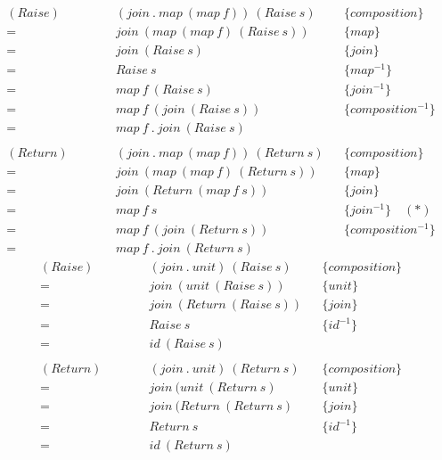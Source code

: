\begin{framed}
  \begin{align*}
      (Raise)\qquad
      &\quad (join\ .\ map\ (map\ f))\ (Raise\ s) && \{composition\}\\
      =&\quad join\ (map\ (map\ f)\ (Raise\ s)) && \{map\}\\
      =&\quad join\ (Raise\ s)  && \{join\}\\
      =&\quad Raise\ s\ && \{map^{-1}\}\\
      =&\quad map\ f\ (Raise\ s) && \{join^{-1}\}\\
      =&\quad map\ f\ (join\ (Raise\ s)) && \{composition^{-1}\}\\
      =&\quad map\ f\ .\ join\ (Raise\ s)\\\\
      (Return)\qquad
      &\quad (join\ .\ map\ (map\ f))\ (Return\ s) && \{composition\}\\
      =&\quad join\ (map\ (map\ f)\ (Return\ s)) && \{map\}\\
      =&\quad join\ (Return\ (map\ f\ s))  && \{join\}\\
      =&\quad map\ f\ s && \{join^{-1}\} \quad(*)\\
      =&\quad map\ f\ (join\ (Return\ s)) && \{composition^{-1}\}\\
      =&\quad map\ f\ .\ join\ (Return\ s)\
  \end{align*}
  \begin{align*}
      (Raise)\qquad
      &\quad (join\ .\ unit)\ (Raise\ s) && \{composition\}\\
      =&\quad join\ (unit\ (Raise\ s)) && \{unit\}\\
      =&\quad join\ (Return\ (Raise\ s)) && \{join\}\\
      =&\quad Raise\ s && \{id^{-1}\}\\
      =&\quad id\ (Raise\ s) \\\\
      (Return)\qquad
      &\quad (join\ .\ unit)\ (Return\ s) && \{composition\}\\
      =&\quad join\ (unit\ (Return\ s) && \{unit\}\\
      =&\quad join\ (Return\ (Return\ s) && \{join\}\\
      =&\quad Return\ s && \{id^{-1}\}\\
      =&\quad id\ (Return\ s)
  \end{align*}


\end{framed}
